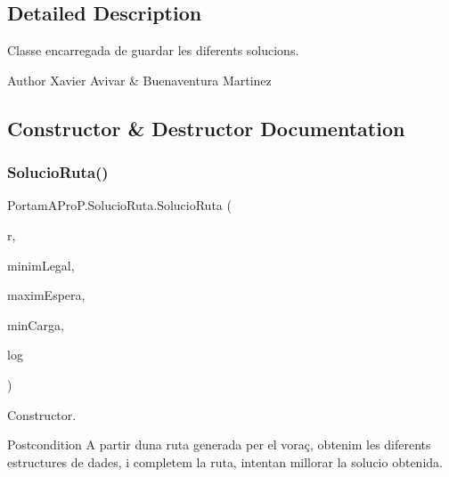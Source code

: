 \subsection{Detailed Description}
Classe encarregada de guardar les diferents solucions. 

\begin{DoxyAuthor}{Author}
Xavier Avivar \& Buenaventura Martinez 
\end{DoxyAuthor}


\subsection{Constructor \& Destructor Documentation}
\mbox{\label{class_portam_a_pro_p_1_1_solucio_ruta_a8dfc53d75c5971b680d848d069e5d7c9}} 
\subsubsection{\texorpdfstring{Solucio\+Ruta()}{SolucioRuta()}\hspace{0.1cm}{\footnotesize\ttfamily [1/2]}}
{\footnotesize\ttfamily Portam\+A\+Pro\+P.\+Solucio\+Ruta.\+Solucio\+Ruta (\begin{DoxyParamCaption}\item[{\hyperlink{class_portam_a_pro_p_1_1_ruta}{Ruta}}]{r,  }\item[{int}]{minim\+Legal,  }\item[{int}]{maxim\+Espera,  }\item[{double}]{min\+Carga,  }\item[{String\+Builder}]{log }\end{DoxyParamCaption})}



Constructor. 

\begin{DoxyPostcond}{Postcondition}
A partir d\textquotesingle{}una ruta generada per el voraç, obtenim les diferents estructures de dades, i completem la ruta, intentan millorar la solucio obtenida. 
\end{DoxyPostcond}


